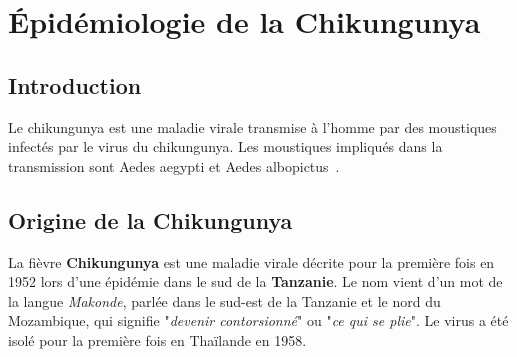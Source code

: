 \chapter{Épidémiologie de la Chikungunya}


\section*{Introduction}
Le chikungunya est une maladie virale transmise à l'homme par des moustiques infectés par le virus du chikungunya. Les moustiques impliqués dans la transmission sont Aedes aegypti et Aedes albopictus~\cite{intro}. 
\section{Origine de la Chikungunya}
La fièvre \textbf{Chikungunya} est une maladie virale décrite pour la première fois en 1952 lors d'une épidémie dans le sud de la \textbf{Tanzanie}. Le nom vient d'un mot de la langue \textit{Makonde}, parlée dans le sud-est de la Tanzanie et le nord du Mozambique, qui signifie "\textit{devenir contorsionné}" ou "\textit{ce qui se plie}". Le virus a été isolé pour la première fois en Thaïlande en 1958.\cite{origin}

